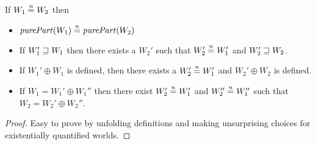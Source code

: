 \begin{lemma}
  \label{lem:n-equality-props}
  If $W_1 \overset{n}{=} W_2$ then
  \begin{itemize}
  \item $\purePart{W_1} \nequal \purePart{W_2}$
  \item If $W_1' \sqsupseteq W_1$ then there exists a $W_2'$ such that $W_2' \overset{n}{=} W_1'$ and $W_2' \sqsupseteq W_2$.
  \item If $W_1' \oplus W_1$ is defined, then there exists a $W_2' \overset{n}{=} W_1'$ and $W_2' \oplus W_2$ is defined.
  \item If $W_1 = W_1' \oplus W_1''$ then there exist $W_2' \overset{n}{=} W_1'$ and $W_2'' \overset{n}{=} W_1''$ such that $W_2 = W_2' \oplus W_2''$.
  \end{itemize}
\end{lemma}
\begin{proof}
  Easy to prove by unfolding definitions and making unsurprising choices for existentially quantified worlds.
\end{proof}

